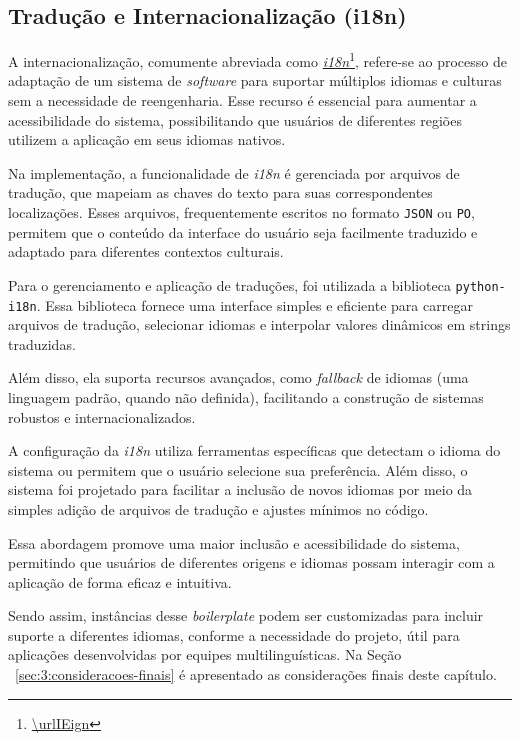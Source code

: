 \subsection{Tradução e Internacionalização (i18n)}

A internacionalização, comumente abreviada como \href{\urlIEign}{\textit{i18n}}\footnote{\url{\urlIEign}}, refere-se ao processo de adaptação de um sistema de \textit{software} para suportar múltiplos idiomas e culturas sem a necessidade de reengenharia. Esse recurso é essencial para aumentar a acessibilidade do sistema, possibilitando que usuários de diferentes regiões utilizem a aplicação em seus idiomas nativos.

Na implementação, a funcionalidade de \textit{i18n} é gerenciada por arquivos de tradução, que mapeiam as chaves do texto para suas correspondentes localizações. Esses arquivos, frequentemente escritos no formato \texttt{JSON} ou \texttt{PO}, permitem que o conteúdo da interface do usuário seja facilmente traduzido e adaptado para diferentes contextos culturais.

Para o gerenciamento e aplicação de traduções, foi utilizada a biblioteca \texttt{python-i18n}. Essa biblioteca fornece uma interface simples e eficiente para carregar arquivos de tradução, selecionar idiomas e interpolar valores dinâmicos em strings traduzidas.

Além disso, ela suporta recursos avançados, como \textit{fallback} de idiomas (uma linguagem padrão, quando não definida), facilitando a construção de sistemas robustos e internacionalizados.

A configuração da \textit{i18n} utiliza ferramentas específicas que detectam o idioma do sistema ou permitem que o usuário selecione sua preferência. Além disso, o sistema foi projetado para facilitar a inclusão de novos idiomas por meio da simples adição de arquivos de tradução e ajustes mínimos no código.

Essa abordagem promove uma maior inclusão e acessibilidade do sistema, permitindo que usuários de diferentes origens e idiomas possam interagir com a aplicação de forma eficaz e intuitiva.

Sendo assim, instâncias desse \textit{boilerplate} podem ser customizadas para incluir suporte a diferentes idiomas, conforme a necessidade do projeto, útil para aplicações desenvolvidas por equipes multilinguísticas. Na Seção ~\ref{sec:3:consideracoes-finais} é apresentado as considerações finais deste capítulo.

